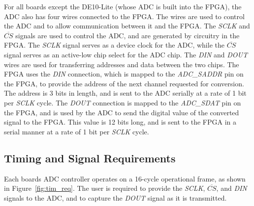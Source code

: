 \documentclass[11pt, twoside, pdftex]{article}
\begin{document}
For all boards except the DE10-Lite (whose ADC is built into the FPGA), the ADC also has four wires connected to the FPGA. The wires are used to control the ADC and to allow communication between it and the FPGA. The {\it SCLK}  and $\overline{CS}$ signals are used to control the ADC, and are generated by circuitry in the FPGA. The {\it SCLK} signal serves as a device clock for the ADC, while the $\overline{CS}$ signal serves as an active-low chip select for the ADC chip. The {\it DIN} and {\it DOUT} wires are used for transferring addresses and data between the two chips. The FPGA uses the {\it DIN} connection, which is mapped to the {\it ADC\_SADDR} pin on the FPGA, to provide the address of the next channel requested for conversion. The address is 3 bits in length, and is sent to the ADC serially at a rate of 1 bit per {\it SCLK} cycle. The {\it DOUT} connection is mapped to the {\it ADC\_SDAT} pin on the FPGA, and is used by the ADC to send the digital value of the converted signal to the FPGA. This value is 12 bits long, and is sent to the FPGA in a serial manner at a rate of 1 bit per {\it SCLK} cycle.

\subsection{Timing and Signal Requirements}
Each boards ADC controller operates on a 16-cycle operational frame, as shown in Figure~\ref{fig:tim_req}. The user is required to provide the \textit{SCLK}, $\overline{CS}$, and \textit{DIN} signals to the ADC, and to capture the \textit{DOUT} signal as it is transmitted.
\end{document}
